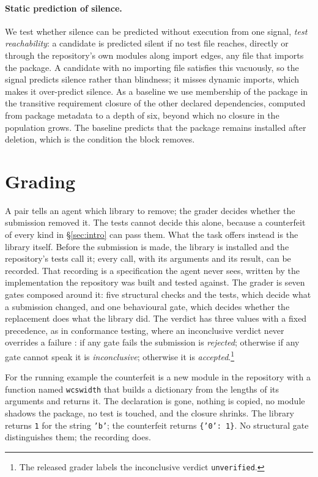 \documentclass[11pt]{article}
\newcommand{\code}[1]{\texttt{\small #1}}
\begin{document}
\paragraph{Static prediction of silence.}
We test whether silence can be predicted without execution from one signal, \emph{test reachability}: a candidate is predicted silent if no test file reaches, directly or through the repository's own modules along import edges, any file that imports the package.
A candidate with no importing file satisfies this vacuously, so the signal predicts silence rather than blindness; it misses dynamic imports, which makes it over-predict silence.
As a baseline we use membership of the package in the transitive requirement closure of the other declared dependencies, computed from package metadata to a depth of six, beyond which no closure in the population grows. %
The baseline predicts that the package remains installed after deletion, which is the condition the block removes.

\section{Grading}
\label{sec:method-grade}

A pair tells an agent which library to remove; the grader decides whether the submission removed it.
The tests cannot decide this alone, because a counterfeit of every kind in \S\ref{sec:intro} can pass them.
What the task offers instead is the library itself.
Before the submission is made, the library is installed and the repository's tests call it; every call, with its arguments and its result, can be recorded.
That recording is a specification the agent never sees, written by the implementation the repository was built and tested against.
The grader is seven gates composed around it: five structural checks and the tests, which decide what a submission changed, and one behavioural gate, which decides whether the replacement does what the library did.
The verdict has three values with a fixed precedence, as in conformance testing, where an inconclusive verdict never overrides a failure \citep{etsi2023ttcn3}: if any gate fails the submission is \emph{rejected}; otherwise if any gate cannot speak it is \emph{inconclusive}; otherwise it is \emph{accepted}.\footnote{The released grader labels the inconclusive verdict \code{unverified}.}

For the running example the counterfeit is a new module in the repository with a function named \code{wcswidth} that builds a dictionary from the lengths of its arguments and returns it.
The declaration is gone, nothing is copied, no module shadows the package, no test is touched, and the closure shrinks.
The library returns \code{1} for the string \code{'b'}; the counterfeit returns \code{\{'0': 1\}}.
No structural gate distinguishes them; the recording does.
\end{document}
